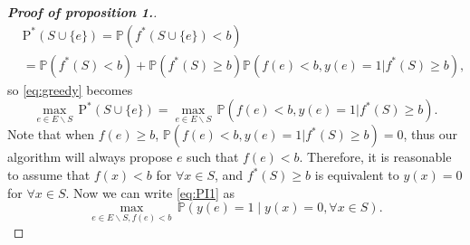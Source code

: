 \documentclass[12pt]{article}
\newcommand{\PI}{\text{P}^*}
\begin{document}
\begin{proof}[\bf{Proof of proposition 1.}]
  \begin{equation*}
    \begin{split}
      &\PI(S \cup \{e\}) = \mathbb{P}(f^*(S\cup \{e\})<b)\\
      &= \mathbb{P}(f^*(S)<b) + \mathbb{P}(f^*(S)\geq b) \mathbb{P}(f(e)<b, y(e)=1|f^*(S)\geq b),
    \end{split}
  \end{equation*}
  so \eqref{eq:greedy} becomes
  \begin{equation} \label{eq:PI1} 
    \underset{e \in E \backslash S}{\max} \, \PI(S \cup \{e\}) = \underset{e \in E \backslash S}{\max} \, \mathbb{P}(f(e)<b, y(e)=1|f^*(S)\geq b).
  \end{equation}
  Note that when $f(e) \geq b$, $\mathbb{P}(f(e)<b, y(e)=1|f^*(S)\geq b)=0$, thus our algorithm will always propose $e$ such that $f(e)<b$. Therefore, it is reasonable to assume that $f(x)<b$ for $\forall x \in S$, and $f^*(S)\geq b$ is equivalent to $y(x)=0$ for $\forall x \in S$. Now we can write \eqref{eq:PI1} as 
  \begin{equation*}
    \underset{e \in E \backslash S, f(e) < b}{\max} \, \mathbb{P} (y(e) = 1 \mid y(x) = 0, \forall x \in S). 
  \end{equation*}
\end{proof}
\end{document}
